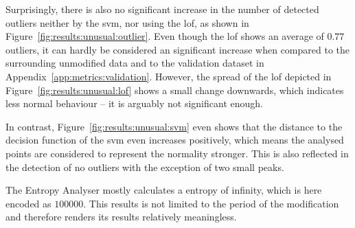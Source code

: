 Surprisingly, there is also no significant increase in the number of detected outliers neither by the \gls{svm}, nor using the \gls{lof}, as shown in Figure~\ref{fig:results:unusual:outlier}.
Even though the \gls{lof} shows an average of $0.77$ outliers, it can hardly be considered an significant increase when compared to the surrounding unmodified data and to the validation dataset in Appendix~\ref{app:metrics:validation}.
However, the spread of the \gls{lof} depicted in Figure~\ref{fig:results:unusual:lof} shows a small change downwards, which indicates less normal behaviour -- it is arguably not significant enough.

In contrast, Figure~\ref{fig:results:unusual:svm} even shows that the distance to the decision function of the \gls{svm} even increases positively, which means the analysed points are considered to represent the normality stronger. This is also reflected in the detection of no outliers with the exception of two small peaks.

The Entropy Analyser mostly calculates a entropy of infinity, which is here encoded as $100000$. This results is not limited to the period of the modification and therefore renders its results relatively meaningless.


